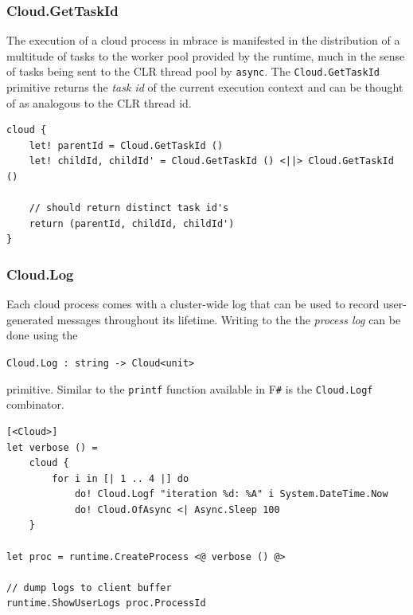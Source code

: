 \documentclass[9pt,a4paper]{article}
\newcommand{\mbrace}{mbrace}
\newcommand{\fsharp}{F\texttt \#}
\newcommand{\centertt}[1]{\begin{center}\texttt{#1}\end{center}}
\begin{document}
\subsubsection*{Cloud.GetTaskId}

The execution of a cloud process in \mbrace{} is manifested in the distribution of
a multitude of tasks to the worker pool provided by the runtime, much in the
sense of tasks being sent to the CLR thread pool by \texttt{async}.
The \texttt{Cloud.GetTaskId} primitive returns the \emph{task id} of the current
execution context and can be thought of as analogous to the CLR thread id.
\begin{lstlisting}
cloud {
    let! parentId = Cloud.GetTaskId ()
    let! childId, childId' = Cloud.GetTaskId () <||> Cloud.GetTaskId ()
    
    // should return distinct task id's
    return (parentId, childId, childId')
}
\end{lstlisting}

\subsubsection*{Cloud.Log}

Each cloud process comes with a cluster-wide log that can be used to record
user-generated messages throughout its lifetime. Writing to the
the \emph{process log} can be done using the
\centertt{Cloud.Log : string -> Cloud<unit>}
primitive. Similar to the \texttt{printf} function available in \fsharp{} 
is the \texttt{Cloud.Logf} combinator.
\begin{lstlisting}
[<Cloud>]
let verbose () =
    cloud {
        for i in [| 1 .. 4 |] do
            do! Cloud.Logf "iteration %d: %A" i System.DateTime.Now
            do! Cloud.OfAsync <| Async.Sleep 100
    }

let proc = runtime.CreateProcess <@ verbose () @>

// dump logs to client buffer
runtime.ShowUserLogs proc.ProcessId
\end{lstlisting}
\end{document}
